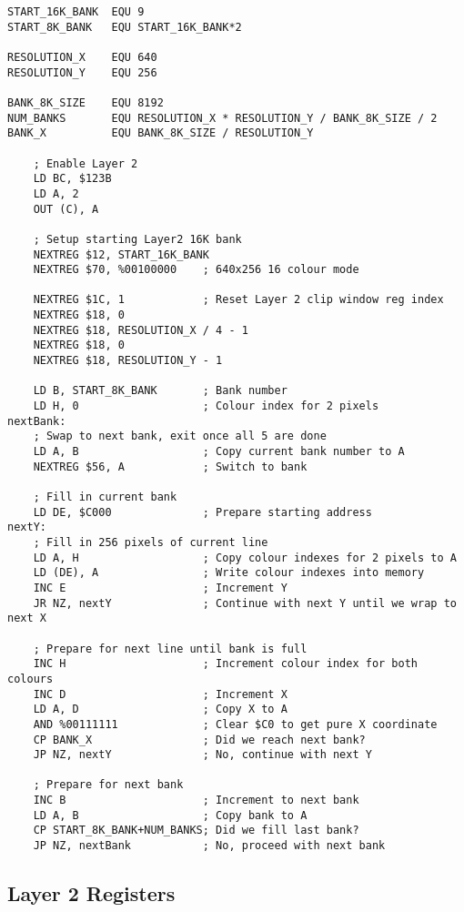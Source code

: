 \begin{lstlisting}
START_16K_BANK  EQU 9
START_8K_BANK   EQU START_16K_BANK*2

RESOLUTION_X    EQU 640
RESOLUTION_Y    EQU 256

BANK_8K_SIZE    EQU 8192
NUM_BANKS       EQU RESOLUTION_X * RESOLUTION_Y / BANK_8K_SIZE / 2
BANK_X          EQU BANK_8K_SIZE / RESOLUTION_Y

    ; Enable Layer 2
    LD BC, $123B
    LD A, 2
    OUT (C), A

    ; Setup starting Layer2 16K bank
    NEXTREG $12, START_16K_BANK
    NEXTREG $70, %00100000    ; 640x256 16 colour mode

    NEXTREG $1C, 1            ; Reset Layer 2 clip window reg index
    NEXTREG $18, 0
    NEXTREG $18, RESOLUTION_X / 4 - 1
    NEXTREG $18, 0
    NEXTREG $18, RESOLUTION_Y - 1

    LD B, START_8K_BANK       ; Bank number
    LD H, 0                   ; Colour index for 2 pixels
nextBank:
    ; Swap to next bank, exit once all 5 are done
    LD A, B                   ; Copy current bank number to A
    NEXTREG $56, A            ; Switch to bank

    ; Fill in current bank
    LD DE, $C000              ; Prepare starting address
nextY:
    ; Fill in 256 pixels of current line
    LD A, H                   ; Copy colour indexes for 2 pixels to A
    LD (DE), A                ; Write colour indexes into memory
    INC E                     ; Increment Y
    JR NZ, nextY              ; Continue with next Y until we wrap to next X

    ; Prepare for next line until bank is full
    INC H                     ; Increment colour index for both colours
    INC D                     ; Increment X
    LD A, D                   ; Copy X to A
    AND %00111111             ; Clear $C0 to get pure X coordinate
    CP BANK_X                 ; Did we reach next bank?
    JP NZ, nextY              ; No, continue with next Y

    ; Prepare for next bank
    INC B                     ; Increment to next bank
    LD A, B                   ; Copy bank to A
    CP START_8K_BANK+NUM_BANKS; Did we fill last bank?
    JP NZ, nextBank           ; No, proceed with next bank
\end{lstlisting}


\subsection{Layer 2 Registers}
\label{zx_next_layer2_registers}

